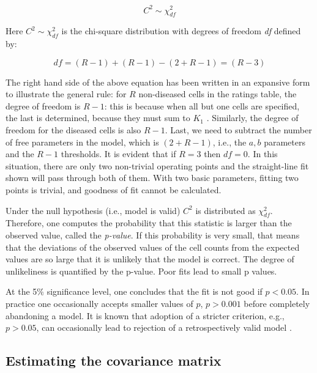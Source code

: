 \documentclass[
]{book}
\begin{document}
\begin{equation} 
C^2\sim \chi_{df}^{2}
\label{eq:BinModGoodnessFitDistr}
\end{equation}

Here \(C^2\sim \chi_{df}^{2}\) is the chi-square distribution with degrees of freedom \emph{df} defined by:

\begin{equation} 
df=\left ( R-1 \right )+\left ( R-1 \right )-\left (2+ R-1 \right )=\left ( R-3 \right )
\label{eq:BinModGoodnessFitdf}
\end{equation}

The right hand side of the above equation has been written in an expansive form to illustrate the general rule: for \(R\) non-diseased cells in the ratings table, the degree of freedom is \(R-1\): this is because when all but one cells are specified, the last is determined, because they must sum to \(K_1\) . Similarly, the degree of freedom for the diseased cells is also \(R-1\). Last, we need to subtract the number of free parameters in the model, which is \((2+R-1)\), i.e., the \(a,b\) parameters and the \(R-1\) thresholds. It is evident that if \(R = 3\) then \(df = 0\). In this situation, there are only two non-trivial operating points and the straight-line fit shown will pass through both of them. With two basic parameters, fitting two points is trivial, and goodness of fit cannot be calculated.

Under the null hypothesis (i.e., model is valid) \(C^2\) is distributed as \(\chi_{df}^{2}\). Therefore, one computes the probability that this statistic is larger than the observed value, called the \emph{p-value}. If this probability is very small, that means that the deviations of the observed values of the cell counts from the expected values are so large that it is unlikely that the model is correct. The degree of unlikeliness is quantified by the p-value. Poor fits lead to small p values.

At the 5\% significance level, one concludes that the fit is not good if \(p < 0.05\). In practice one occasionally accepts smaller values of \(p\), \(p > 0.001\) before completely abandoning a model. It is known that adoption of a stricter criterion, e.g., \(p > 0.05\), can occasionally lead to rejection of a retrospectively valid model \citep{RN300}.

\hypertarget{estimating-the-covariance-matrix}{%
\subsection{Estimating the covariance matrix}\label{estimating-the-covariance-matrix}}
\end{document}

